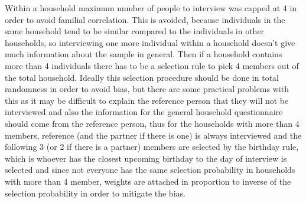 Within a household maximum number of people to interview was capped at 4 in order to avoid familial correlation. This is avoided, because individuals in the same household tend to be similar compared to the individuals in other households, so interviewing one more individual within a household doesn't give much information about the sample in general. Then if a household contains more than 4 individuals there has to be a selection rule to pick 4 members out of the total household. Ideally this selection procedure should be done in total randomness in order to avoid bias, but there are some practical problems with this as it may be difficult to explain the reference person that they will not be interviewed and also the information for the general household questionnaire should come from the reference person, thus for the households with more than 4 members, reference (and the partner if there is one) is always interviewed and the following 3 (or 2 if there is a partner) members are selected by the birthday rule, which is whoever has the closest upcoming birthday to the day of interview is selected and since not everyone has the same selection probability in households with more than 4 member, weights are attached in proportion to inverse of the selection probability in order to mitigate the bias.
